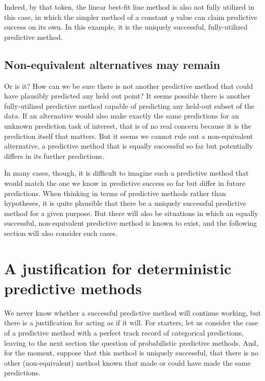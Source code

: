\documentclass[
  letterpaper,
  DIV=11,
  numbers=noendperiod]{scrartcl}
\theoremstyle{definition}
\theoremstyle{remark}
\begin{document}
Indeed, by that token, the linear best-fit line method is also not fully
utilized in this case, in which the simpler method of a constant \(y\)
value can claim predictive success on its own. In this example, it is
the uniquely successful, fully-utilized predictive method.

\subsection{Non-equivalent alternatives may
remain}\label{non-equivalent-alternatives-may-remain}

Or is it? How can we be sure there is not another predictive method that
could have plausibly predicted any held out point? It seems possible
there is another fully-utilized predictive method capable of predicting
any held-out subset of the data. If an alternative would also make
exactly the same predictions for an unknown prediction task of interest,
that is of no real concern because it is the prediction itself that
matters. But it seems we cannot rule out a non-equivalent alternative, a
predictive method that is equally successful so far but potentially
differs in its further predictions.

In many cases, though, it is difficult to imagine such a predictive
method that would match the one we know in predictive success so far but
differ in future predictions. When thinking in terms of predictive
methods rather than hypotheses, it is quite plausible that there be a
uniquely successful predictive method for a given purpose. But there
will also be situations in which an equally successful, non-equivalent
predictive method is known to exist, and the following section will also
consider such cases.

\section{A justification for deterministic predictive
methods}\label{sec-prag}

We never know whether a successful predictive method will continue
working, but there is a justification for acting as if it will. For
starters, let us consider the case of a predictive method with a perfect
track record of categorical predictions, leaving to the next section the
question of probabilistic predictive methods. And, for the moment,
suppose that this method is uniquely successful, that there is no other
(non-equivalent) method known that made or could have made the same
predictions.
\end{document}
